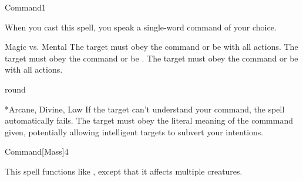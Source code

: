 \begin{spellsection}{Command}{1}
    \begin{spellheader}
    \end{spellheader}
    \begin{spellcontent}
        \begin{spelltargetinginfo}
        \end{spelltargetinginfo}
        \begin{spelleffects}
            \spellspecial When you cast this spell, you speak a single-word command of your choice.
            \begin{spellattack}{Magic vs. Mental}
                \spellsuccess The target must obey the command or be \severelyimpaired with all actions.
                \spellcritical The target must obey the command or be \stunned.
                \spellfailure The target must obey the command or be \impaired with all actions.
            \end{spellattack}
             round
        \end{spelleffects}
    \end{spellcontent}
    \begin{spellfooter}
        *{Arcane, Divine, Law}
        \spellnotes If the target can't understand your command, the spell automatically fails. The target must obey the literal meaning of the commmand given, potentially allowing intelligent targets to subvert your intentions.
        \miscastrandom
    \end{spellfooter}
\end{spellsection}

\begin{spellsection}{Command}[Mass]{4}
    \begin{spellheader}
    \end{spellheader}
    \begin{spellcontent}
        \begin{spelltargetinginfo}
        \end{spelltargetinginfo}
        \begin{spelleffects}
            \spellspecial This spell functions like , except that it affects multiple creatures.
        \end{spelleffects}
    \end{spellcontent}
    \begin{spellfooter}
        \miscastexplode
    \end{spellfooter}
\end{spellsection}

